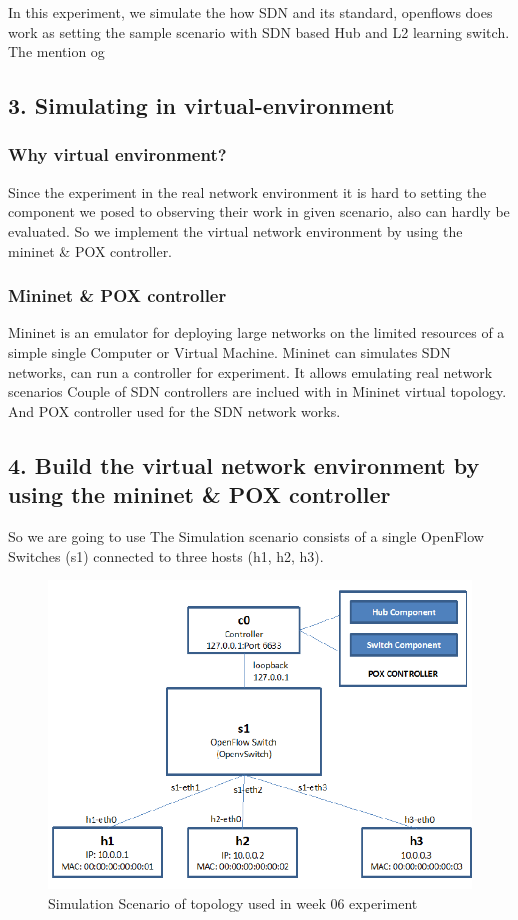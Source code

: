 In this experiment, we simulate the how SDN and its standard, openflows does work as setting the sample scenario with SDN based Hub and L2 learning switch. 
The mention og
\subsection*{3. Simulating in virtual-environment}
\subsubsection*{Why virtual environment?}
Since the experiment in the real network environment it is hard to setting the component we posed to observing their work in given scenario, also can hardly be evaluated. So we implement the virtual network environment by using the mininet \& POX controller.  
\subsubsection*{Mininet \& POX controller}
Mininet is an emulator for deploying large networks on the limited resources of a simple single Computer or Virtual Machine. 
Mininet can simulates SDN networks, can run a controller for experiment. It allows emulating real network scenarios Couple of SDN controllers are inclued with in Mininet virtual topology. And POX controller used for the SDN network works.
\subsection*{4. Build the virtual network environment by  using the mininet \& POX controller}
So we are going to use
The Simulation scenario consists of a single OpenFlow Switches (s1) connected to three hosts (h1, h2, h3).\\
\vspace{-4mm}
\begin{figure}[!h]\centering 
	\includegraphics[width=.55\textwidth]{image/week06/0-1.png}
	\caption{\footnotesize 
	Simulation Scenario of topology used in week 06 experiment}
	\vspace{-10pt}
\end{figure}

